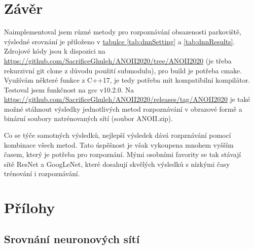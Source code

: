 \documentclass[10pt,a4paper, table]{article}
\begin{document}
\section{Závěr}
Naimplementoval jsem různé metody pro rozpoznávání obsazenosti parkoviště, výsledné srovnání je přiloženo v \hyperref[tab:dnnSetting]{tabulce \ref{tab:dnnSetting}} a \hyperref[tab:dnnResults]{\ref{tab:dnnResults}}. Zdrojové kódy jsou k dispozici na \url{https://github.com/SacrificeGhuleh/ANOII2020/tree/ANOII2020} (je třeba rekurzivní git clone z důvodu použití submodulu), pro build je potřeba cmake. Využívám některé funkce z C++17, je tedy potřeba mít kompatibilní kompilátor. Testoval jsem funkčnost na gcc v10.2.0. Na \url{https://github.com/SacrificeGhuleh/ANOII2020/releases/tag/ANOII2020} je také možné stáhnout výsledky jednotlivých metod rozpoznávání v obrazové formě a binární soubory natrénovaných sítí (soubor ANOII.zip).\par
Co se týče samotných výsledků, nejlepší výsledek dává rozpznávání pomocí kombinace všech metod. Tato úspěšnost je však vykoupena mnohem vyšším časem, který je potřeba pro rozpoznání. Mými osobními favority se tak stávají sítě ResNet a GoogLeNet, které dosahují skvělých výsledků s nízkými časy trénování i rozpoznávání.

\clearpage
\section*{Přílohy}


\subsection*{Srovnání neuronových sítí}

\end{document}
